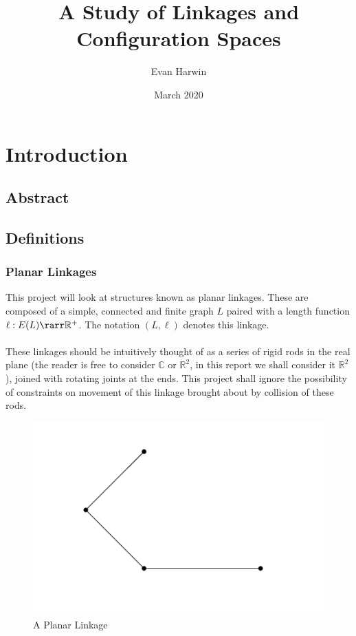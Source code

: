 \documentclass{article}
\title{A Study of Linkages and Configuration Spaces}
\author{Evan Harwin}
\date{March 2020}
\begin{document}
\maketitle

\section{Introduction}
\subsection{Abstract}
\subsection{Definitions}

\subsubsection{Planar Linkages}

This project will look at structures known as planar linkages. These are composed of a simple, connected and finite graph $L$ paired with a length function $\ell: E(L) \rarr \mathbb R^+$. The notation $(L,\ell)$ denotes this linkage. \\\\ These linkages should be intuitively thought of as a series of rigid rods in the real plane (the reader is free to consider $\mathbb C$ or $\mathbb R^2$, in this report we shall consider it $\mathbb R^2$), joined with rotating joints at the ends. This project shall ignore the possibility of constraints on movement of this linkage brought about by collision of these rods.

\begin{figure}[h!]
\centering
\includegraphics[scale=0.5]{./images/2-arm}
\caption{A Planar Linkage}
\label{fig:A Planar Linkage}
\end{figure}
\end{document}
